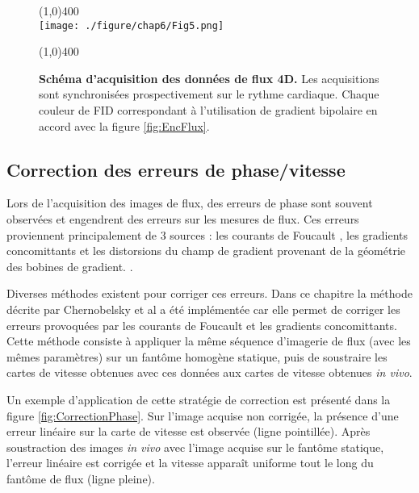 \begin{figure}[H]
\centering
\line(1,0){400} \\
\texttt{[image: ./figure/chap6/Fig5.png]}
\caption[Schéma acquisition des données de flux 4D.]{\label{fig:SchemaAcqFlux} \textbf{Schéma d'acquisition des données de flux 4D.} Les acquisitions sont synchronisées prospectivement sur le rythme cardiaque. Chaque couleur de FID correspondant à l'utilisation de gradient bipolaire en accord avec la figure \ref{fig:EncFlux}.}
\line(1,0){400} \\ 
\end{figure}

\subsection{Correction des erreurs de phase/vitesse}

Lors de l'acquisition des images de flux, des erreurs de phase sont souvent observées et engendrent des erreurs sur les mesures de flux. Ces erreurs proviennent principalement de 3 sources : les courants de Foucault \cite{Walker:1993aa}, les gradients concomittants \cite{Bernstein:1998aa} et les distorsions du champ de gradient provenant de la géométrie des bobines de gradient. \cite{Markl:2003aa}. 

Diverses méthodes existent pour corriger ces erreurs. Dans ce chapitre la méthode décrite par Chernobelsky et al \cite{Chernobelsky:2007aa} a été implémentée car elle permet de corriger les erreurs provoquées par les courants de Foucault et les gradients concomittants. Cette méthode consiste à appliquer la même séquence d'imagerie de flux (avec les mêmes paramètres) sur un fantôme homogène statique, puis de soustraire les cartes de vitesse obtenues avec ces données aux cartes de vitesse obtenues \textit{in vivo}. 

Un exemple d'application de cette stratégie de correction est présenté dans la figure \ref{fig:CorrectionPhase}. Sur l'image acquise non corrigée, la présence d'une erreur linéaire sur la carte de vitesse est observée (ligne pointillée). Après soustraction des images \textit{in vivo} avec l'image acquise sur le fantôme statique, l'erreur linéaire est corrigée et la vitesse apparaît uniforme tout le long du fantôme de flux (ligne pleine).



